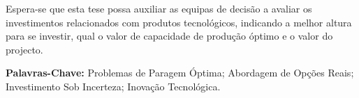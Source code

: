 Espera-se que esta tese possa auxiliar as equipas de decisão a avaliar os investimentos relacionados com produtos tecnológicos, indicando a melhor altura para se investir, qual o valor de capacidade de produção óptimo e o valor do projecto.





\vfill

\textbf{\Large Palavras-Chave:} Problemas de Paragem Óptima; Abordagem de Opções Reais; Investimento Sob Incerteza; Inovação Tecnológica.
